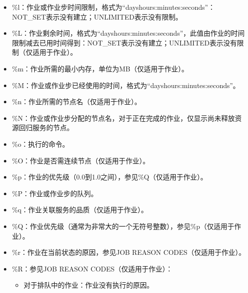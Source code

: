 \documentclass[a4paper,12pt,english]{sphinxmanual}
\begin{document}
\begin{itemize}
\begin{itemize}
\begin{itemize}
\item {} 
\sphinxAtStartPar
\%l：作业或作业步时间限制，格式为“days\sphinxhyphen{}hours:minutes:seconds”：NOT\_SET表示没有建立；UNLIMITED表示没有限制。

\item {} 
\sphinxAtStartPar
\%L：作业剩余时间，格式为“days\sphinxhyphen{}hours:minutes:seconds”，此值由作业的时间限制减去已用时间得到：NOT\_SET表示没有建立；UNLIMITED表示没有限制（仅适用于作业）。

\item {} 
\sphinxAtStartPar
\%m：作业所需的最小内存，单位为MB（仅适用于作业）。

\item {} 
\sphinxAtStartPar
\%M：作业或作业步已经使用的时间，格式为“days\sphinxhyphen{}hours:minutes:seconds”。

\item {} 
\sphinxAtStartPar
\%n：作业所需的节点名（仅适用于作业）。

\item {} 
\sphinxAtStartPar
\%N：作业或作业步分配的节点名，对于正在完成的作业，仅显示尚未释放资源回归服务的节点。

\item {} 
\sphinxAtStartPar
\%o：执行的命令。

\item {} 
\sphinxAtStartPar
\%O：作业是否需连续节点（仅适用于作业）。

\item {} 
\sphinxAtStartPar
\%p：作业的优先级（0.0到1.0之间），参见\%Q（仅适用于作业）。

\item {} 
\sphinxAtStartPar
\%P：作业或作业步的队列。

\item {} 
\sphinxAtStartPar
\%q：作业关联服务的品质（仅适用于作业）。

\item {} 
\sphinxAtStartPar
\%Q：作业优先级（通常为非常大的一个无符号整数），参见\%p（仅适用于作业）。

\item {} 
\sphinxAtStartPar
\%r：作业在当前状态的原因，参见JOB REASON CODES（仅适用于作业）。

\item {} 
\sphinxAtStartPar
\%R：参见JOB REASON CODES（仅适用于作业）：
\begin{itemize}
\item {} 
\sphinxAtStartPar
对于排队中的作业：作业没有执行的原因。


\end{itemize}
\end{itemize}
\end{itemize}
\end{itemize}
\end{document}
